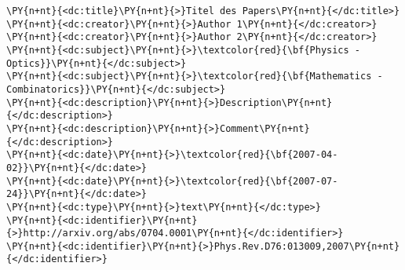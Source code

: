 \begin{Verbatim}[commandchars=\\\{\}, fontsize=\tiny, frame=single]
\PY{n+nt}{<dc:title}\PY{n+nt}{>}Titel des Papers\PY{n+nt}{</dc:title>}
\PY{n+nt}{<dc:creator}\PY{n+nt}{>}Author 1\PY{n+nt}{</dc:creator>}
\PY{n+nt}{<dc:creator}\PY{n+nt}{>}Author 2\PY{n+nt}{</dc:creator>}
\PY{n+nt}{<dc:subject}\PY{n+nt}{>}\textcolor{red}{\bf{Physics - Optics}}\PY{n+nt}{</dc:subject>}
\PY{n+nt}{<dc:subject}\PY{n+nt}{>}\textcolor{red}{\bf{Mathematics - Combinatorics}}\PY{n+nt}{</dc:subject>}
\PY{n+nt}{<dc:description}\PY{n+nt}{>}Description\PY{n+nt}{</dc:description>}
\PY{n+nt}{<dc:description}\PY{n+nt}{>}Comment\PY{n+nt}{</dc:description>}
\PY{n+nt}{<dc:date}\PY{n+nt}{>}\textcolor{red}{\bf{2007-04-02}}\PY{n+nt}{</dc:date>}
\PY{n+nt}{<dc:date}\PY{n+nt}{>}\textcolor{red}{\bf{2007-07-24}}\PY{n+nt}{</dc:date>}
\PY{n+nt}{<dc:type}\PY{n+nt}{>}text\PY{n+nt}{</dc:type>}
\PY{n+nt}{<dc:identifier}\PY{n+nt}{>}http://arxiv.org/abs/0704.0001\PY{n+nt}{</dc:identifier>}
\PY{n+nt}{<dc:identifier}\PY{n+nt}{>}Phys.Rev.D76:013009,2007\PY{n+nt}{</dc:identifier>}
\end{Verbatim}
